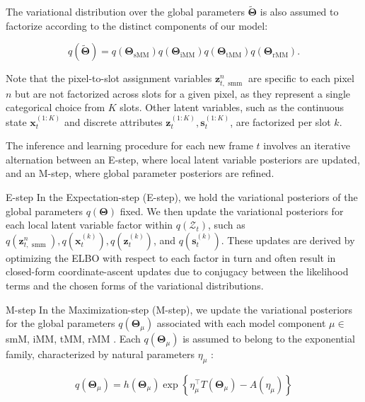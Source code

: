 \documentclass[10pt]{article}
\begin{document}
The variational distribution over the global parameters $\tilde{\boldsymbol{\Theta}}$ is also assumed to factorize according to the distinct components of our model:


\begin{equation*}
q(\tilde{\boldsymbol{\Theta}})=q\left(\boldsymbol{\Theta}_{\mathrm{sMM}}\right) q\left(\boldsymbol{\Theta}_{\mathrm{iMM}}\right) q\left(\boldsymbol{\Theta}_{\mathrm{tMM}}\right) q\left(\boldsymbol{\Theta}_{\mathrm{rMM}}\right) . \tag{36}
\end{equation*}


Note that the pixel-to-slot assignment variables $\mathbf{z}_{t, \text { smm }}^{n}$ are specific to each pixel $n$ but are not factorized across slots for a given pixel, as they represent a single categorical choice from $K$ slots. Other latent variables, such as the continuous state $\mathbf{x}_{t}^{(1: K)}$ and discrete attributes $\mathbf{z}_{t}^{(1: K)}, \mathbf{s}_{t}^{(1: K)}$, are factorized per slot $k$.

The inference and learning procedure for each new frame $t$ involves an iterative alternation between an E-step, where local latent variable posteriors are updated, and an M-step, where global parameter posteriors are refined.

E-step In the Expectation-step (E-step), we hold the variational posteriors of the global parameters $q(\boldsymbol{\Theta})$ fixed. We then update the variational posteriors for each local latent variable factor within $q\left(\mathcal{Z}_{t}\right)$, such as $q\left(\mathbf{z}_{t, \text { smm }}^{n}\right), q\left(\mathbf{x}_{t}^{(k)}\right), q\left(\mathbf{z}_{t}^{(k)}\right)$, and $q\left(\mathbf{s}_{t}^{(k)}\right)$. These updates are derived by optimizing the ELBO with respect to each factor in turn and often result in closed-form coordinate-ascent updates due to conjugacy between the likelihood terms and the chosen forms of the variational distributions.

M-step In the Maximization-step (M-step), we update the variational posteriors for the global parameters $q\left(\boldsymbol{\Theta}_{\mu}\right)$ associated with each model component $\mu \in$ smM, iMM, tMM, rMM . Each $q\left(\boldsymbol{\Theta}_{\mu}\right)$ is assumed to belong to the exponential family, characterized by natural parameters $\eta_{\mu}$ :


\begin{equation*}
q\left(\mathbf{\Theta}_{\mu}\right)=h\left(\mathbf{\Theta}_{\mu}\right) \exp \left\{\eta_{\mu}^{\top} T\left(\mathbf{\Theta}_{\mu}\right)-A\left(\eta_{\mu}\right)\right\} \tag{37}
\end{equation*}
\end{document}
